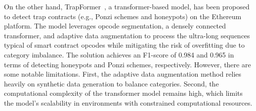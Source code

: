 \documentclass[5p,twocolumn]{elsarticle}
\begin{document}
On the other hand, TrapFormer~\cite{gu2023trap}, a transformer-based model, has been proposed to detect trap contracts (e.g., Ponzi schemes and honeypots) on the Ethereum platform. The model leverages opcode segmentation, a densely connected transformer, and adaptive data augmentation to process the ultra-long sequences typical of smart contract opcodes while mitigating the risk of overfitting due to category imbalance. The solution achieves an F1-score of 0.984 and 0.965 in terms of detecting honeypots and Ponzi schemes, respectively. However, there are some notable limitations. First, the adaptive data augmentation method relies heavily on synthetic data generation to balance categories. Second, the computational complexity of the transformer model remains high, which limits the model's scalability in environments with constrained computational resources.
\end{document}
